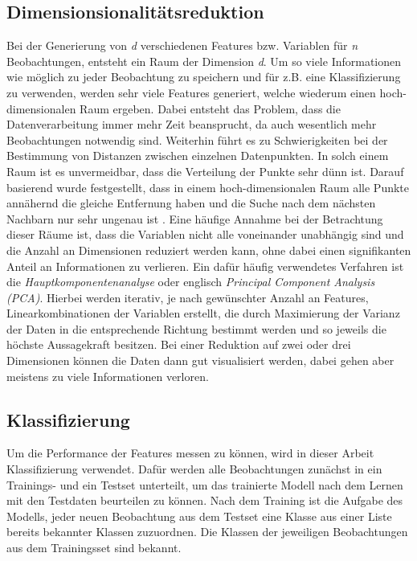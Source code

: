 \subsection{Dimensionsionalitätsreduktion}
Bei der Generierung von \textit{d} verschiedenen Features bzw. Variablen für \textit{n} Beobachtungen, entsteht ein Raum der Dimension \textit{d}. 
Um so viele Informationen wie möglich zu jeder Beobachtung zu speichern und für z.B. eine Klassifizierung zu verwenden, werden sehr viele Features generiert, welche wiederum einen hoch-dimensionalen Raum ergeben. Dabei entsteht das Problem, dass die Datenverarbeitung immer mehr Zeit beansprucht, da auch wesentlich mehr Beobachtungen notwendig sind. Weiterhin führt es zu Schwierigkeiten bei der Bestimmung von Distanzen zwischen einzelnen Datenpunkten. In solch einem Raum ist es unvermeidbar, dass die Verteilung der Punkte sehr dünn ist. Darauf basierend wurde festgestellt, dass in einem hoch-dimensionalen Raum alle Punkte annähernd die gleiche Entfernung haben und die Suche nach dem nächsten Nachbarn nur sehr ungenau ist \cite[Kap.~1]{hinneburg2000nearest}. Eine häufige Annahme bei der Betrachtung dieser Räume ist, dass die Variablen nicht alle voneinander unabhängig sind und die Anzahl an Dimensionen reduziert werden kann, ohne dabei einen signifikanten Anteil an Informationen zu verlieren. Ein dafür häufig verwendetes Verfahren ist die \emph{Hauptkomponentenanalyse} oder englisch \emph{Principal Component Analysis (PCA)}. Hierbei werden iterativ, je nach gewünschter Anzahl an Features, Linearkombinationen der Variablen erstellt, die durch Maximierung der Varianz der Daten in die entsprechende Richtung bestimmt werden und so jeweils die höchste Aussagekraft besitzen. Bei einer Reduktion auf zwei oder drei Dimensionen können die Daten dann gut visualisiert werden, dabei gehen aber meistens zu viele Informationen verloren.

\subsection{Klassifizierung}
Um die Performance der Features messen zu können, wird in dieser Arbeit Klassifizierung verwendet. Dafür werden alle Beobachtungen zunächst in ein Trainings- und ein Testset unterteilt, um das trainierte Modell nach dem Lernen mit den Testdaten beurteilen zu können. Nach dem Training ist die Aufgabe des Modells, jeder neuen Beobachtung aus dem Testset eine Klasse aus einer Liste bereits bekannter Klassen zuzuordnen. Die Klassen der jeweiligen Beobachtungen aus dem Trainingsset sind bekannt.

